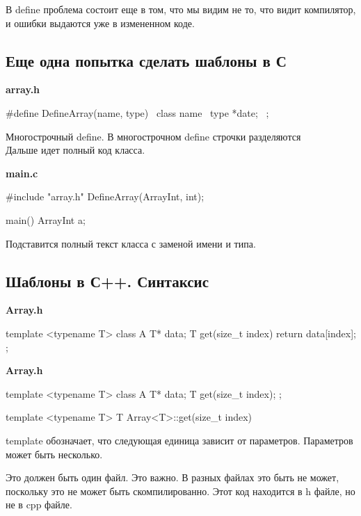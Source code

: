 В define  проблема состоит еще в том, что мы видим не то, что видит компилятор, и ошибки выдаются уже в измененном коде.

\subsection{Еще одна попытка сделать шаблоны в С} 

{\bf array.h}

\begin{cppcode}
#define DefineArray(name, type) \
class name{ \
   type *date; \
};
\end{cppcode}

Многострочный define. В многострочном define строчки разделяются \\

Дальше идет полный код класса. 

{\bf main.c}

\begin{cppcode}
#include "array.h"
DefineArray(ArrayInt, int);

main() {
    ArrayInt a;
}
\end{cppcode}

Подставится полный текст класса с заменой имени и типа. 

\subsection{Шаблоны в С++. Синтаксис}
         
{\bf Array.h}
\begin{cppcode}
template <typename T>
class A {
    T* data;
    T get(size_t index) {
        return data[index];
    }
};
\end{cppcode}

{\bf Array.h}

\begin{cppcode}
template <typename T>
class A {
    T* data;
    T get(size_t index);
};

template <typename T>
T Array<T>::get(size_t index) {

}
\end{cppcode}

template обозначает, что следующая единица зависит от параметров. Параметров может быть несколько. 

Это должен быть один файл. Это важно. В разных файлах это быть не может, поскольку это не может быть скомпилированно. Этот код находится в h файле, но не в cpp файле.

